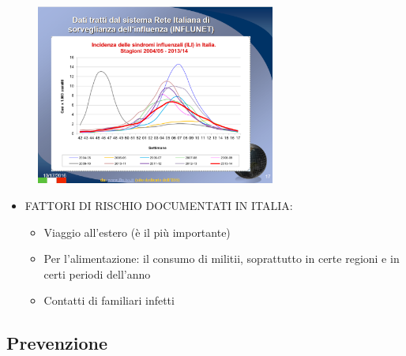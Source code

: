 \begin{figure}[!ht]
\centering
	\includegraphics[width=0.7\textwidth]{02/image3.png}
\end{figure}


\begin{itemize}
\item
  FATTORI DI RISCHIO DOCUMENTATI IN ITALIA:

  \begin{itemize}
  \item
    Viaggio all'estero (è il più importante)
  \item
    Per l'alimentazione: il consumo di militii, soprattutto in certe
    regioni e in certi periodi dell'anno
  \item
    Contatti di familiari infetti
  \end{itemize}
\end{itemize}
\subsection{Prevenzione}


